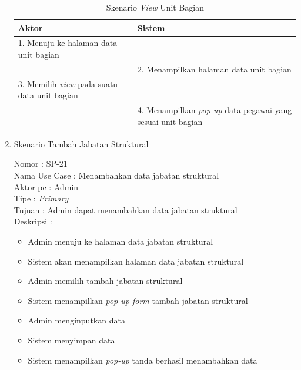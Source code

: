 \begin{enumerate}
\begin{itemize}
\end{itemize}

\begin{table}
	\caption{Skenario \textit{View} Unit Bagian}
	\centering
	\begin{tabular}{ | p{58mm} | p{70mm} |}
		\hline 
		\textbf{Aktor} & \textbf{Sistem} \\
		\hline
		
		1.	Menuju ke halaman data unit bagian &  \\
		
		\hline
		
		&  2.	Menampilkan halaman data unit bagian \\
		
		\hline
		
		3. Memilih \textit{view} pada suatu data unit bagian & \\
		
		\hline
		
		& 4.	Menampilkan \textit{pop-up} data pegawai yang sesuai unit bagian \\
		\hline
		
	\end{tabular}
\end{table}

\item Skenario Tambah Jabatan Struktural

Nomor \kern 3.6pc : SP-21 \\
Nama Use Case : Menambahkan data jabatan struktural \\
Aktor  pc : Admin \\
Tipe \kern 4.6pc : \textit{Primary} \\
Tujuan \kern 3.6pc : Admin dapat menambahkan data jabatan struktural\\
Deskripsi \kern 2.5pc : 

\begin{itemize}
	\item Admin menuju ke halaman data jabatan struktural
	\item Sistem akan menampilkan halaman data jabatan struktural
	\item Admin memilih tambah jabatan struktural
	\item Sistem menampilkan \textit{pop-up form} tambah jabatan struktural
	\item Admin menginputkan data
	\item Sistem menyimpan data
	\item Sistem menampilkan \textit{pop-up} tanda berhasil menambahkan data
	

\end{itemize}
\end{enumerate}
